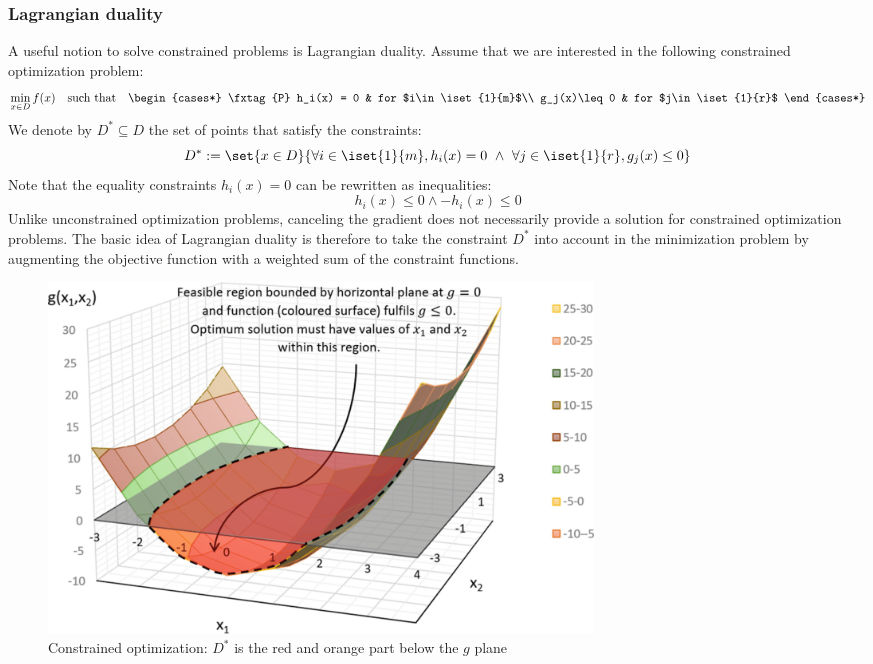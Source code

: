 \documentclass[toc, titlepaged]{../cs-classes/cs-classes}
\begin{document}
\subsubsection{Lagrangian duality}
A useful notion to solve constrained problems is Lagrangian duality. Assume that we are interested in the following constrained optimization problem:
\begin{equation}
    \label{eq:optimization-problem}
    \min_{x\in D}f(x) \quad \textnormal{such that}\quad 
    \begin{cases*}
        \tag{P}
        h_i(x) = 0 & for $i\in\iset{1}{m}$\\
        g_j(x)\leq0 & for $j\in\iset{1}{r}$
    \end{cases*}
\end{equation}
We denote by $D^*\subseteq D$ the set of points that satisfy the constraints:
\begin{equation*}
    D^* := \set{x\in D}{\forall i\in\iset{1}{m}, h_i(x)=0 \land \forall j\in\iset{1}{r}, g_j(x)\leq 0}
\end{equation*}
Note that the equality constraints $h_i(x)=0$ can be rewritten as inequalities:
\begin{equation*}
    h_i(x)\leq0 \land -h_i(x)\leq0
\end{equation*}
Unlike unconstrained optimization problems, canceling the gradient does not necessarily provide a solution for constrained optimization problems. The basic idea of Lagrangian duality is therefore to take the constraint $D^*$ into account in the minimization problem by augmenting the objective function with a weighted sum of the constraint functions.

\begin{figure}
    \centering
    \includegraphics[width=0.7\textwidth]{images/constrained-optimization.png}
    \caption{Constrained optimization: $D^*$ is the red and orange part below the $g$ plane}
\end{figure}
\end{document}
